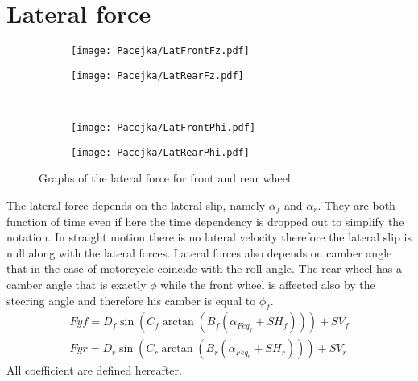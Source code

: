 \section{Lateral force}
%
\begin{figure}%
    \begin{subfigure}{.5\textwidth}
        \texttt{[image: Pacejka/LatFrontFz.pdf]}
        \caption{}
        \label{fig:lat1a}
    \end{subfigure}%
    \begin{subfigure}{.5\textwidth}
        \texttt{[image: Pacejka/LatRearFz.pdf]}
        \caption{}
        \label{fig:lat1b}
    \end{subfigure}\\
    \begin{subfigure}{.5\textwidth}
        \texttt{[image: Pacejka/LatFrontPhi.pdf]}
        \caption{}
        \label{fig:lat1c}
    \end{subfigure}%
    \begin{subfigure}{.5\textwidth}
        \texttt{[image: Pacejka/LatRearPhi.pdf]}
        \caption{}
        \label{fig:lat1d}
    \end{subfigure}
    \caption{Graphs of the lateral force for front and rear wheel}
\end{figure}
%
%
The lateral force depends on the lateral slip, namely $\alpha_f$ and $\alpha_r$. They are both function of time even if here the time dependency is dropped out to simplify the notation. In straight motion there is no lateral velocity therefore the lateral slip is null along with the lateral forces. Lateral forces also depends on camber angle that in the case of motorcycle coincide with the roll angle. The rear wheel has a camber angle that is exactly $\phi$ while the front wheel is affected also by the steering angle and therefore his camber is equal to $\phi_f$. 
%
\begin{equation}
    \begin{array}{l}
        Fyf = D_f \sin(C_f \arctan(B_f ( \alpha_{Feq_f} + SH_f))) + SV_f\\
        Fyr = D_r \sin(C_r \arctan(B_r ( \alpha_{Feq_r} + SH_r))) + SV_r
    \end{array}
\end{equation}
%
All coefficient are defined hereafter.
%
